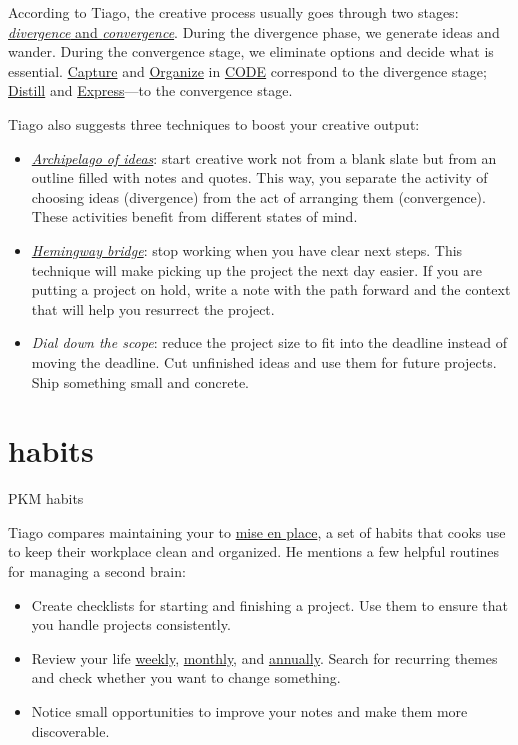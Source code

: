 \documentclass{article}
\begin{document}
According to Tiago, the creative process usually goes through two stages: \href{https://fortelabs.com/blog/divergence-and-convergence-the-two-fundamental-stages-of-the-creative-process/}{\emph{divergence} and \emph{convergence}}.
During the divergence phase, we generate ideas and wander.
During the convergence stage, we eliminate options and decide what is essential.
\href{#capture}{Capture} and \href{#organize}{Organize} in \href{#code}{CODE} correspond to the divergence stage; \href{#distill}{Distill} and \href{#express}{Express}---to the convergence stage.

Tiago also suggests three techniques to boost your creative output:
\begin{itemize}
  \item 
    \href{https://fortelabs.com/blog/just-in-time-pm-21-workflow-strategies/}{\emph{Archipelago of ideas}}: start creative work not from a blank slate but from an outline filled with notes and quotes.
    This way, you separate the activity of choosing ideas (divergence) from the act of arranging them (convergence).
    These activities benefit from different states of mind.
  \item 
    \href{https://medium.com/@mstine/day-6-how-you-can-use-hemingways-bridge-to-ship-today-s-momentum-to-tomorrow-a1af14e300ef}{\emph{Hemingway bridge}}: stop working when you have clear next steps.
    This technique will make picking up the project the next day easier.
    If you are putting a project on hold, write a note with the path forward and the context that will help you resurrect the project.
  \item 
    \emph{Dial down the scope}: reduce the project size to fit into the deadline instead of moving the deadline.
    Cut unfinished ideas and use them for future projects.
    Ship something small and concrete.
\end{itemize}

\section{habits}{PKM habits}

Tiago compares maintaining your  to \href{https://en.wikipedia.org/wiki/Mise_en_place}{mise en place}, a set of habits that cooks use to keep their workplace clean and organized.
He mentions a few helpful routines for managing a second brain:
\begin{itemize}
  \item 
    Create checklists for starting and finishing a project.
    Use them to ensure that you handle projects consistently.
  \item 
    Review your life \href{https://fortelabs.com/blog/the-weekly-review-is-an-operating-system/}{weekly}, \href{https://fortelabs.com/blog/the-monthly-review-is-a-systems-check/}{monthly}, and \href{https://fortelabs.com/blog/the-annual-review-is-a-rearchitecture/}{annually}.
    Search for recurring themes and check whether you want to change something.
  \item 
     Notice small opportunities to improve your notes and make them more discoverable.
\end{itemize}
\end{document}
